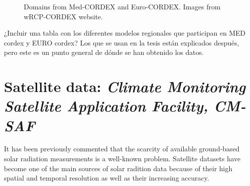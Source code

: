 \begin{figure}[!tbp]
  \centering
  \hfill
  \caption{Domains from Med-CORDEX and Euro-CORDEX. Images from wRCP-CORDEX website.}
    \label{fig:cordexdomain}
\end{figure}

{\color{red}¿Incluir una tabla con los diferentes modelos regionales que participan en MED cordex y EURO cordex? Los que se usan en la tesis están explicados después, pero este es un punto general de dónde se han obtenido los datos.}
\section{Satellite data: \textit{Climate Monitoring Satellite Application Facility, CM-SAF}}
 
It has been previously commented that the scarcity of available ground-based solar radiation measurements is a well-known problem. Satellite datasets have become one of the main sources of solar radition data because of their high spatial and temporal resolution as well as their increasing accuracy.

